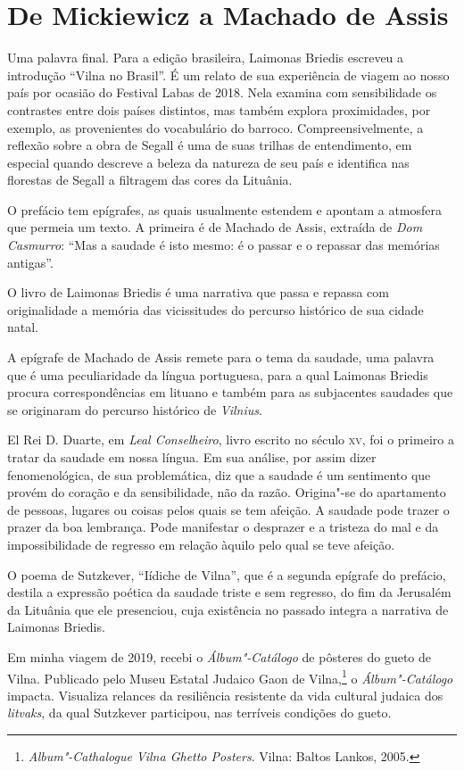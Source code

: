 \section{De Mickiewicz a Machado de Assis}

Uma palavra final. Para a edição brasileira, Laimonas Briedis escreveu
a introdução ``Vilna no Brasil''. É um relato de sua experiência de
viagem ao nosso país por ocasião do Festival Labas de 2018. Nela examina
com sensibilidade os contrastes entre dois países distintos, mas também
explora proximidades, por exemplo, as provenientes do vocabulário do
barroco. Compreensivelmente, a reflexão sobre a obra de Segall é uma de
suas trilhas de entendimento, em especial quando descreve a beleza da
natureza de seu país e identifica nas florestas de Segall a filtragem
das cores da Lituânia.

O prefácio tem epígrafes, as quais usualmente estendem e apontam a
atmosfera que permeia um texto. A primeira é de Machado de Assis,
extraída de \textit{Dom Casmurro}: ``Mas a saudade é isto mesmo: é o
passar e o repassar das memórias antigas''.

O livro de Laimonas Briedis é uma narrativa que passa e repassa com
originalidade a memória das vicissitudes do percurso histórico de sua
cidade natal.

A epígrafe de Machado de Assis remete para o tema da saudade, uma
palavra que é uma peculiaridade da língua portuguesa, para a qual
Laimonas Briedis procura correspondências em lituano e também para as
subjacentes saudades que se originaram do percurso histórico de \textit{Vilnius}.

El Rei D. Duarte, em \textit{Leal Conselheiro}, livro escrito no século \textsc{xv}, 
foi o primeiro a tratar da saudade em nossa língua. Em sua análise, por assim dizer
fenomenológica, de sua problemática, diz que a saudade é um sentimento
que provém do coração e da sensibilidade, não da razão. Origina"-se do
apartamento de pessoas, lugares ou coisas pelos quais se tem afeição. A
saudade pode trazer o prazer da boa lembrança. Pode manifestar o
desprazer e a tristeza do mal e da impossibilidade de regresso em
relação àquilo pelo qual se teve afeição.

O poema de Sutzkever, ``Iídiche de Vilna'', que é a segunda epígrafe do
prefácio, destila a expressão poética da saudade triste e sem regresso,
do fim da Jerusalém da Lituânia que ele presenciou, cuja existência no
passado integra a narrativa de Laimonas Briedis.

Em minha viagem de 2019, recebi o \textit{Álbum"-Catálogo} de
pôsteres do gueto de Vilna. Publicado pelo Museu Estatal Judaico Gaon de
Vilna,\footnote{\textit{Album"-Cathalogue Vilna Ghetto Posters}. Vilna: Baltos Lankos, 2005.} o 
\textit{Álbum"-Catálogo} impacta. Visualiza relances da resiliência
resistente da vida cultural judaica dos \textit{litvaks}, da qual
Sutzkever participou, nas terríveis condições do gueto.

